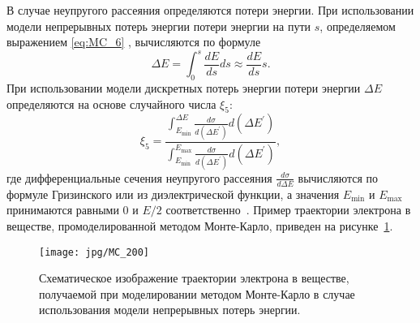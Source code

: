В случае неупругого рассеяния определяются потери энергии. При использовании модели непрерывных потерь энергии потери энергии на пути $s$, определяемом выражением \ref{eq:MC_6} , вычисляются по формуле
\begin{equation} \label{eq:MC_15}
	\Delta E=\int_0^s \frac{d E}{d s} d s \approx \frac{d E}{d s} s.
\end{equation}
При использовании модели дискретных потерь энергии потери энергии $\Delta E$ определяются на основе случайного числа $\xi_5$:
\begin{equation} \label{eq:MC_16}
	\xi_5 = \frac
	{\displaystyle \int_{E_\mathrm{min}}^{\Delta E} \frac{d \sigma}{d\left(\Delta E^{\prime}\right)} d\left(\Delta E^{\prime}\right)}
	{\displaystyle \int_{E_\mathrm{min}}^{E_\mathrm{max}} \frac{d \sigma}{d\left(\Delta E^{\prime}\right)} d\left(\Delta E^{\prime}\right)},
\end{equation}
где дифференциальные сечения неупругого рассеяния $\displaystyle{\frac{d \sigma}{d \Delta E}}$ вычисляются по формуле Гризинского или из диэлектрической функции, а значения $E_\mathrm{min}$ и $E_\mathrm{max}$ принимаются равными $0$ и $E/2$ соответственно~\cite{Dapor_large_book}. Пример траектории электрона в веществе, промоделированной методом Монте-Карло, приведен на рисунке~\ref{fig:Monte_Carlo_scheme}.

\begin{figure}[h]
	\centering
	\texttt{[image: jpg/MC\_200]}
	\vspace{-0.5em}
	\caption{Схематическое изображение траектории электрона в веществе, получаемой при моделировании методом Монте-Карло в случае использования модели непрерывных потерь энергии.\vspace{1.5em}}
	\label{fig:Monte_Carlo_scheme}
\end{figure}
